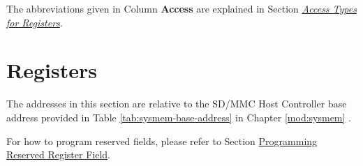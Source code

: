 \documentclass[main\_\_EN.tex]{subfiles}
\begin{document}
The abbreviations given in Column \textbf{Access} are explained in Section \hyperref[glossary-access-types]{\textit{Access Types for Registers}}.






\newpage
\section{Registers}

The addresses in this section are relative to the SD/MMC Host Controller base address provided in Table \ref{tab:sysmem-base-address} in Chapter \ref{mod:sysmem} \textit{}.

For how to program reserved fields, please refer to Section \hyperref[programming-reserved-field]{Programming Reserved Register Field}.


\end{document}
